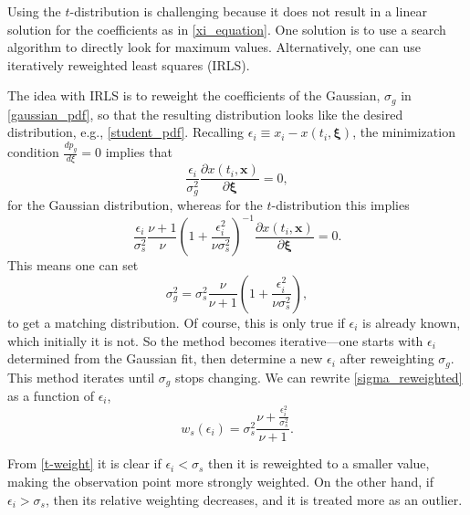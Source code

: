 \documentclass{ametsoc}
\begin{document}
\appendix[B]
\label{appendixB:irls}

Using the $t$-distribution is challenging because it does not result in a linear solution for the coefficients as in \eqref{xi_equation}. One solution is to use a search algorithm to directly look for maximum values. Alternatively, one can use iteratively reweighted least squares (IRLS).

The idea with IRLS is to reweight the coefficients of the Gaussian, $\sigma_g$ in \eqref{gaussian_pdf}, so that the resulting distribution looks like the desired distribution, e.g., \eqref{student_pdf}. Recalling $\epsilon_i \equiv x_i - x(t_i,\mathbf{\xi})$, the minimization condition $\frac{d p_g}{d\xi}=0$ implies that
\begin{equation}
\frac{\epsilon_i}{\sigma_g^2} \frac{\partial x(t_i,\mathbf{x})}{\partial \mathbf{\xi}} = 0,
\end{equation}
for the Gaussian distribution, whereas for the $t$-distribution this implies
\begin{equation}
 \frac{\epsilon_i}{\sigma_s^2} \frac{\nu+1}{\nu} \left( 1 + \frac{\epsilon_i^2}{\nu \sigma_s^2} \right)^{-1}  \frac{\partial x(t_i,\mathbf{x})}{\partial \mathbf{\xi}}  = 0.
\end{equation}
This means one can set
\begin{equation}
\sigma_g^2 =   \sigma_s^2 \frac{\nu}{\nu+1} \left( 1 + \frac{\epsilon_i^2}{\nu \sigma_s^2} \right),
\label{sigma_reweighted}
\end{equation}
to get a matching distribution. Of course, this is only true if $\epsilon_i$ is already known, which initially it is not. So the method becomes iterative---one starts with $\epsilon_i$ determined from the Gaussian fit, then determine a new $\epsilon_i$ after reweighting $\sigma_g$. This method iterates until $\sigma_g$ stops changing. We can rewrite \eqref{sigma_reweighted} as a function of $\epsilon_i$,
\begin{equation}
\label{t-weight}
w_s(\epsilon_i) = \sigma_s^2 \frac{\nu  + \frac{\epsilon_i^2}{\sigma_s^2}}{\nu+1}.
\end{equation}

From \eqref{t-weight} it is clear if $\epsilon_i < \sigma_s$ then it is reweighted to a smaller value, making the observation point more strongly weighted. On the other hand, if $\epsilon_i > \sigma_s$, then its relative weighting decreases, and it is treated more as an outlier.
\end{document}
